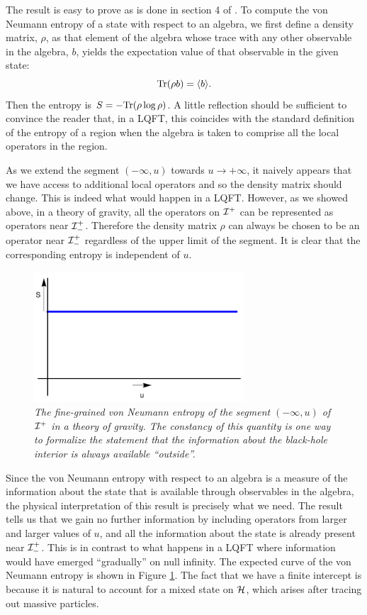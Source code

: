 \documentclass[12pt]{article}
\def\tr{{\rm Tr}}
\newcommand{\be}{\begin{equation}}
\newcommand{\ee}{\end{equation}}
\def \scrip{{\cal I}^{+}}
\def \scrippast{{\cal I}^{+}_{-}}
\begin{document}
The result is easy to prove as is done in section 4 of \cite{Laddha:2020kvp}. To compute the von Neumann entropy of a state with respect to an algebra, we first define a density matrix, $\rho$,  as that element of the algebra whose trace with any other observable in the algebra, $b$, yields the expectation value of that observable in the given state: 
\be
\tr(\rho b) = \langle b \rangle.
\ee
Then the entropy is $S = -\tr(\rho \log \rho)$. A little reflection should be sufficient to convince the reader that, in a LQFT, this coincides with the standard definition of the entropy of a region when the algebra is taken to comprise all the local operators in the region. 


 As we extend the segment $(-\infty, u)$ towards $u \rightarrow +\infty$,   it naively appears that we have access to additional local operators and so the density matrix should change.  This is indeed what would happen in a LQFT. However, as we showed above, in  a theory of gravity, all the operators on $\scrip$ can be represented as operators near $\scrippast$. Therefore the density matrix $\rho$ can always be chosen to be an operator near $\scrippast$ regardless of the upper limit of the segment. It is clear that the corresponding entropy is independent of $u$.

\begin{figure}[!ht]
\begin{center}
\includegraphics[width=0.7\textwidth]{truepage.pdf}
\caption{\em The fine-grained von Neumann entropy of the segment $(-\infty, u)$ of $\scrip$ in a theory of gravity. The constancy of this quantity is one way to formalize the  statement that the information about the black-hole interior is always available ``outside''. \label{figvn}}
\end{center}
\end{figure}

Since the von Neumann entropy with respect to an algebra is a measure of the information about the state that is available through observables in the algebra, the physical interpretation of this result is precisely what we need.  The result tells us that we gain no further information by including operators from larger and larger values of $u$, and all the information about the state is already present near $\scrippast$. This is in contrast to what happens in a LQFT where information would have emerged ``gradually'' on null infinity.  The expected curve of the von Neumann entropy is shown in Figure \ref{figvn}. The fact that we have a finite intercept is because it is natural to account for a mixed state on  ${\cal H}$, which arises after tracing out massive particles.
\end{document}
